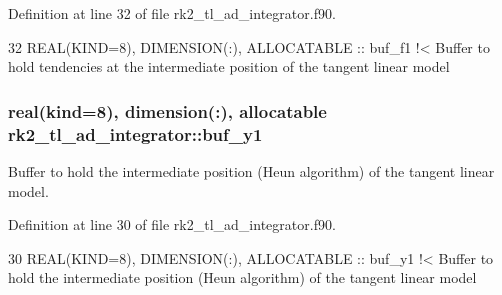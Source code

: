Definition at line 32 of file rk2\+\_\+tl\+\_\+ad\+\_\+integrator.\+f90.


\begin{DoxyCode}
32   \textcolor{keywordtype}{REAL(KIND=8)}, \textcolor{keywordtype}{DIMENSION(:)}, \textcolor{keywordtype}{ALLOCATABLE} :: buf\_f1\textcolor{comment}{ !< Buffer to hold tendencies at the intermediate
       position of the tangent linear model}
\end{DoxyCode}
\subsubsection[{\texorpdfstring{buf\+\_\+y1}{buf_y1}}]{\setlength{\rightskip}{0pt plus 5cm}real(kind=8), dimension(\+:), allocatable rk2\+\_\+tl\+\_\+ad\+\_\+integrator\+::buf\+\_\+y1\hspace{0.3cm}{\ttfamily [private]}}\hypertarget{namespacerk2__tl__ad__integrator_afacb3ff63a02a9f4db66699cdca4b05b}{}\label{namespacerk2__tl__ad__integrator_afacb3ff63a02a9f4db66699cdca4b05b}


Buffer to hold the intermediate position (Heun algorithm) of the tangent linear model. 



Definition at line 30 of file rk2\+\_\+tl\+\_\+ad\+\_\+integrator.\+f90.


\begin{DoxyCode}
30   \textcolor{keywordtype}{REAL(KIND=8)}, \textcolor{keywordtype}{DIMENSION(:)}, \textcolor{keywordtype}{ALLOCATABLE} :: buf\_y1\textcolor{comment}{ !< Buffer to hold the intermediate position (Heun
       algorithm) of the tangent linear model}
\end{DoxyCode}
